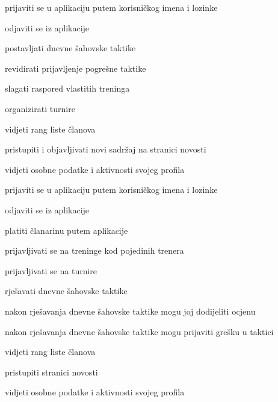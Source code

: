 			
			\begin{packed_enum}
				\item  {}
				
				\begin{packed_enum}
					
					\item prijaviti se u aplikaciju putem korisničkog imena i lozinke
					\item odjaviti se iz aplikacije
					\item postavljati dnevne šahovske taktike
					\item revidirati prijavljenje pogrešne taktike
					\item slagati raspored vlastitih treninga
					\item organizirati turnire
					\item vidjeti rang liste članova
					\item pristupiti i objavljivati novi sadržaj na stranici novosti 
					\item vidjeti osobne podatke i aktivnosti svojeg profila
					
				\end{packed_enum}
			
				\item  {}
				
				\begin{packed_enum}
					
					\item prijaviti se u aplikaciju putem korisničkog imena i lozinke
					\item odjaviti se iz aplikacije
					\item platiti članarinu putem aplikacije
					\item prijavljivati se na treninge kod pojedinih trenera
					\item prijavljivati se na turnire
					\item rješavati dnevne šahovske taktike
					\begin{packed_enum}
						
						\item nakon rješavanja dnevne šahovske taktike mogu joj dodijeliti ocjenu
						\item nakon rješavanja dnevne šahovske taktike mogu prijaviti grešku u taktici
						
					\end{packed_enum}
					\item vidjeti rang liste članova
					\item pristupiti stranici novosti
					\item vidjeti osobne podatke i aktivnosti svojeg profila
					

\end{packed_enum}
\end{packed_enum}

